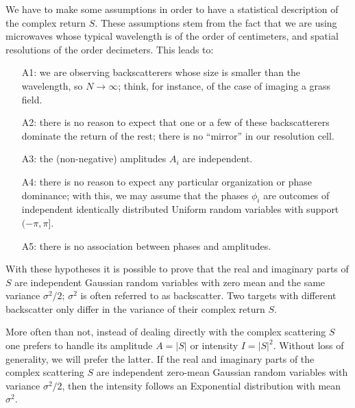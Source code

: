 \documentclass{beamer}
\begin{document}
\begin{frame}[allowframebreaks]
We have to make some assumptions in order to have a statistical description of the complex return $S$.
These assumptions stem from the fact that we are using microwaves whose typical wavelength is of the order of centimeters, and spatial resolutions of the order decimeters.
This leads to:
\begin{small}
\begin{itemize}
\item[A1:] we are observing backscatterers whose size is smaller than the wavelength, so $N\to\infty$; think, for instance, of the case of imaging a grass field.
\item[A2:] there is no reason to expect that one or a few of these backscatterers dominate the return of the rest; there is no ``mirror'' in our resolution cell.
\item[A3:] the (non-negative) amplitudes $A_i$ are independent.
\item[A4:] there is no reason to expect any particular organization or phase dominance; with this, we may assume that the phases $\phi_i$ are outcomes of independent identically distributed Uniform random variables with support $(-\pi,\pi]$.
\item[A5:] there is no association between phases and amplitudes.
\end{itemize}
\end{small}
\end{frame} 

\begin{frame}[allowframebreaks]
With these hypotheses it is possible to prove that the real and imaginary parts of $S$ are independent Gaussian random variables with zero mean and the same variance $\sigma^2/2$; $\sigma^2$ is often referred to as backscatter.
Two targets with different backscatter only differ in the variance of their complex return $S$.

More often than not, instead of dealing directly with the complex scattering $S$ one prefers to handle its amplitude $A=|S|$ or intensity $I=|S|^2$.
Without loss of generality, we will prefer the latter.
If the real and imaginary parts of the complex scattering $S$ are independent zero-mean Gaussian random variables with variance $\sigma^2/2$, then the intensity follows an Exponential distribution with mean $\sigma^2$.
\end{frame}
\end{document}
